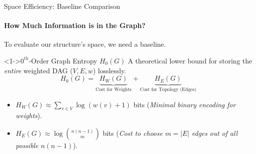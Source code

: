 \begin{frame}{Space Efficiency: Baseline Comparison}
    \framesubtitle{How Much Information is in the Graph?}
    To evaluate our structure's space, \alert{we need a baseline}.
    \begin{block}<1->{$0^{th}$-Order Graph Entropy $H_0(G)$}
        A theoretical lower bound for storing the \emph{entire} weighted DAG ($V, E, w$) losslessly.
        \[ H_0(G) = \underbrace{H_W(G)}_{\text{Cost for Weights}} + \underbrace{H_E(G)}_{\text{Cost for Topology (Edges)}} \]
    \end{block}
    \begin{itemize}
        \item<2-> $H_W(G) \approx \sum_{v \in V} \log(w(v)+1)$ bits (\emph{Minimal binary encoding for weights}).
        \item<3-> $H_E(G) \approx \log \binom{n(n-1)}{m}$ bits (\emph{Cost to choose $m=|E|$ edges out of all possible $n(n-1)$}).
    \end{itemize}
    \vspace{0.5em}

\end{frame}



